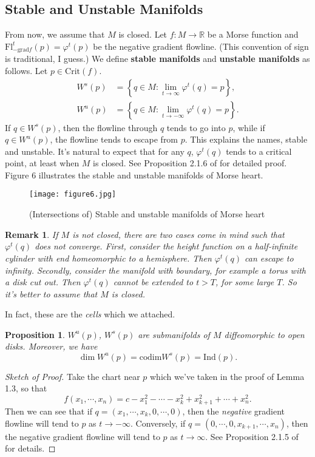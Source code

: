 \documentclass{article}
\newtheorem{proposition}[theorem]{Proposition}
\newtheorem{remark}[theorem]{Remark}
\newcommand{\R}{\mathbb{R}}
\newcommand{\vp}{\varphi}
\newcommand{\Crit}{\mathrm{Crit}}
\newcommand{\grad}{\mathrm{grad}}
\newcommand{\Ind}{\mathrm{Ind}}
\newcommand{\Fl}{\mathrm{Fl}}
\newcommand{\codim}{\mathrm{codim}}
\begin{document}
\subsection{Stable and Unstable Manifolds}
From now, we assume that $M$ is closed.
Let $f:M\to\R$ be a Morse function and $\Fl^t_{-\grad f}(p)=\vp^t(p)$ be the negative gradient flowline.
(This convention of sign is traditional, I guess.)
We define \textbf{stable manifolds} and \textbf{unstable manifolds} as follows.
Let $p\in\Crit(f)$.
	$$\begin{aligned}
	W^s(p)&=\left\{q\in M:\lim_{t\to\infty}\vp^t(q)=p\right\},\\
	W^u(p)&=\left\{q\in M:\lim_{t\to-\infty}\vp^t(q)=p\right\}.
	\end{aligned}$$
If $q\in W^s(p)$, then the flowline through $q$ tends to go into $p$, while if $q\in W^u(p)$, the flowline tends to escape from $p$.
This explains the names, stable and unstable.
It's natural to expect that for any $q$, $\vp^t(q)$ tends to a critical point, at least when $M$ is closed.
See Proposition 2.1.6 of \cite{ad} for detailed proof.
Figure 6 illustrates the stable and unstable manifolds of Morse heart.

\begin{figure}[h]
		\centering
		\texttt{[image: figure6.jpg]}
		\caption{(Intersections of) Stable and unstable manifolds of Morse heart}
\end{figure}

	\begin{remark}\rm
	If $M$ is not closed, there are two cases come in mind such that $\vp^t(q)$ does not converge.
	First, consider the height function on a half-infinite cylinder with end homeomorphic to a hemisphere.
	Then $\vp^t(q)$ can escape to infinity.
	Secondly, consider the manifold with boundary, for example a torus with a disk cut out.
	Then $\vp^t(q)$ cannot be extended to $t>T$, for some large $T$.
	So it's better to assume that $M$ is closed.
	\end{remark}
	
In fact, these are the \emph{cells} which we attached.
	\begin{proposition}\rm
	$W^u(p)$, $W^s(p)$ are submanifolds of $M$ diffeomorphic to open disks.
	Moreover, we have
		$$\dim W^u(p)=\codim W^s(p)=\Ind(p).$$
	\end{proposition}
		\begin{proof}[Sketch of Proof]
		Take the chart near $p$ which we've taken in the proof of Lemma 1.3, so that
			$$f(x_1,\cdots,x_n)=c-x_1^2-\cdots-x_k^2+x_{k+1}^2+\cdots+x_n^2.$$
		Then we can see that if $q=(x_1,\cdots,x_k,0,\cdots,0)$, then the \emph{negative} gradient flowline will tend to $p$ as $t\to-\infty$.
		Conversely, if $q=(0,\cdots,0,x_{k+1},\cdots,x_n)$, then the negative gradient flowline will tend to $p$ as $t\to\infty$.
		See Proposition 2.1.5 of \cite{ad} for details.
		\end{proof}
\end{document}
